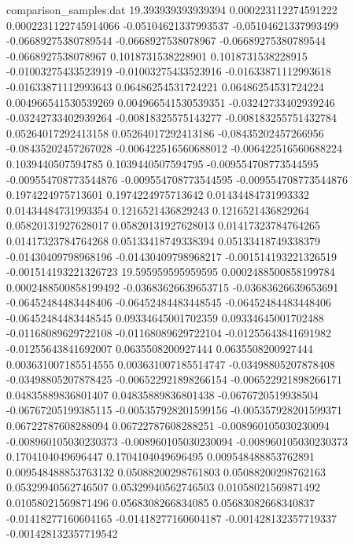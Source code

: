 \begin{filecontents}{comparison_samples.dat}
19.393939393939394  0.000223112274591222    0.0002231122745914066   -0.05104621337993537   -0.05104621337993499   -0.06689275380789544   -0.0668927538078967    -0.06689275380789544   -0.0668927538078967    0.1018731538228901     0.1018731538228915     -0.01003275433523919    -0.01003275433523916    -0.01633871112993618   -0.01633871112993643   0.06486254531724221     0.06486254531724224     0.004966541530539269    0.004966541530539351    -0.03242733402939246    -0.03242733402939264    -0.00818325575143277    -0.008183255751432784   0.05264017292413158     0.05264017292413186     -0.08435202457266956    -0.08435202457267028    -0.006422516560688012  -0.006422516560688224  0.1039440507594785     0.1039440507594795     -0.009554708773544595   -0.009554708773544876   -0.009554708773544595   -0.009554708773544876   0.1974224975713601     0.1974224975713642     0.01434484731993332     0.01434484731993354     0.1216521436829243     0.1216521436829264     0.05820131927628017     0.05820131927628013     0.01417323784764265     0.01417323784764268     0.05133418749338394    0.05133418749338379    -0.01430409798968196   -0.01430409798968217   -0.001514193221326519   -0.001514193221326723 
19.595959595959595  0.0002488500858199784   0.0002488500858199492   -0.03683626639653715   -0.03683626639653691   -0.06452484483448406   -0.06452484483448545   -0.06452484483448406   -0.06452484483448545   0.09334645001702359    0.09334645001702488    -0.01168089629722108    -0.01168089629722104    -0.01255643841691982   -0.01255643841692007   0.0635508200927444      0.0635508200927444      0.003631007185514555    0.003631007185514747    -0.03498805207878408    -0.03498805207878425    -0.006522921898266154   -0.006522921898266171   0.04835889836801407     0.04835889836801438     -0.0676720519938504     -0.06767205199385115    -0.005357928201599156  -0.005357928201599371  0.06722787608288094    0.06722787608288251    -0.008960105030230094   -0.008960105030230373   -0.008960105030230094   -0.008960105030230373   0.1704104049696447     0.1704104049696495     0.009548488853762891    0.009548488853763132    0.05088200298761803    0.05088200298762163    0.05329940562746507     0.05329940562746503     0.01058021569871492     0.01058021569871496     0.0568308266834085     0.05683082668340837    -0.01418277160604165   -0.01418277160604187   -0.001428132357719337   -0.001428132357719542 

\end{filecontents}
